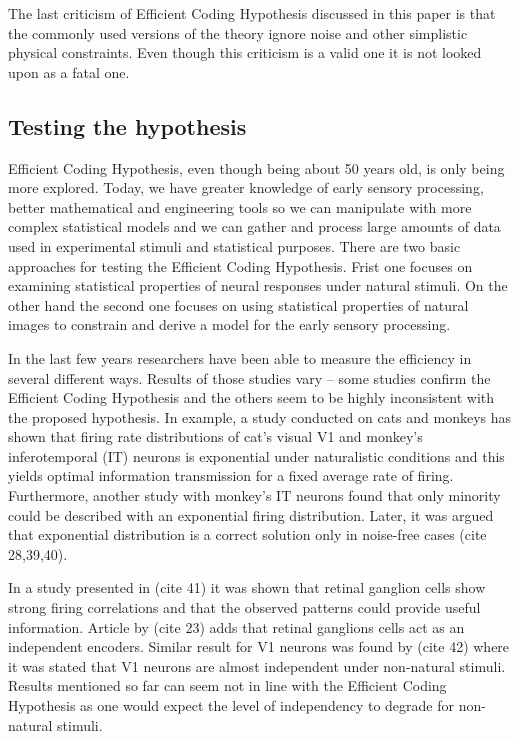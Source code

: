 \documentclass[twoside]{article}
\begin{document}
\begin{multicols}{2}
The last criticism of Efficient Coding Hypothesis discussed in this paper is that the commonly used versions of the theory ignore noise and other simplistic physical constraints. Even though this criticism is a valid one it is not looked upon as a fatal one. 

\subsection{Testing the hypothesis}

Efficient Coding Hypothesis, even though being about 50 years old, is only being more explored. Today, we have greater knowledge of early sensory processing, better mathematical and engineering tools so we can manipulate with more complex statistical models and we can gather and process large amounts of data used in experimental stimuli and statistical purposes. 
There are two basic approaches for testing the Efficient Coding Hypothesis. Frist one focuses on examining statistical properties of neural responses under natural stimuli. On the other hand the second one focuses on using statistical properties of natural images to constrain and derive a model for the early sensory processing.

In the last few years researchers have been able to measure the efficiency in several different ways. Results of those studies vary – some studies confirm the Efficient Coding Hypothesis and the others seem to be highly inconsistent with the proposed hypothesis.  In example, a study conducted on cats and monkeys has shown that firing rate distributions of cat’s visual V1 and monkey’s inferotemporal (IT) neurons is exponential under naturalistic conditions and this yields optimal information transmission for a fixed average rate of firing. Furthermore, another study with monkey’s IT neurons found that only minority could be described with an exponential firing distribution. Later, it was argued that exponential distribution is a correct solution only in noise-free cases (cite 28,39,40). 

In a study presented in (cite 41) it was shown that retinal ganglion cells show strong firing correlations and that the observed patterns could provide useful information.  Article by (cite 23) adds that retinal ganglions cells act as an independent encoders. Similar result for V1 neurons was found by (cite 42) where it was stated that V1 neurons are almost independent under non-natural stimuli. Results mentioned so far can seem not in line with the Efficient Coding Hypothesis as one would expect the level of independency to degrade for non-natural stimuli. 


\end{multicols}
\end{document}
